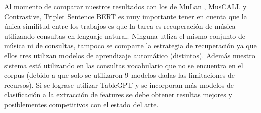 Al momento de comparar nuestros resultados con los de MuLan \cite{Huang2022MuLanAJ}, MusCALL \cite{Manco2022ContrastiveAL} y Contrastive, Triplet Sentence BERT \cite{Doh2022TowardUT} es muy importante tener en cuenta que la única similitud entre los trabajos es que la tarea es recuperación de música utilizando consultas en lenguaje natural. Ninguna utliza el mismo conjunto de música ni de consultas, tampoco se comparte la estrategia de recuperación ya que ellos tres utilizan modelos de aprendizaje automático (distintos). Además nuestro sistema está utilizando en las consultas vocabulario que no se encuentra en el corpus (debido a que solo se utilizaron 9 modelos dadas las limitaciones de recursos). Si se lograse utilizar TableGPT \cite{Gong2020TableGPTFT} y se incorporan más modelos de clasificación a la extracción de features se debe obtener resultas mejores y posiblementes competitivos con el estado del arte.
